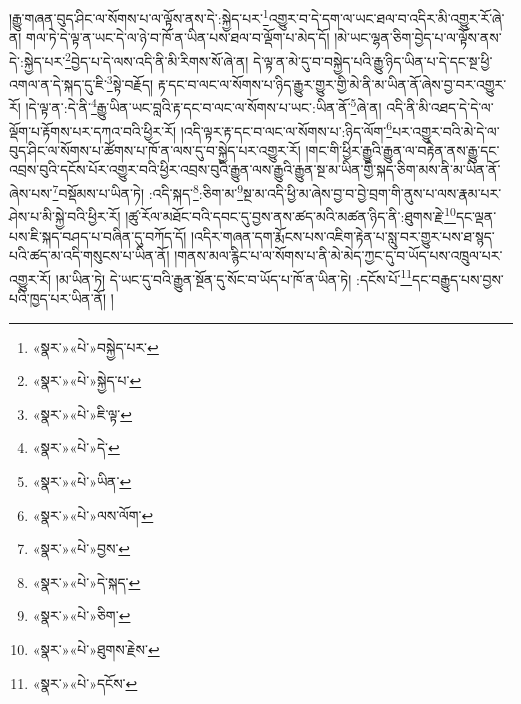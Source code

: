 །རྒྱུ་གཞན་བུད་ཤིང་ལ་སོགས་པ་ལ་ལྟོས་ནས་དེ་:སྐྱེད་པར་\footnote{«སྣར་»«པེ་»བསྐྱེད་པར་}འགྱུར་བ་དེ་དག་ལ་ཡང་ཐལ་བ་འདིར་མི་འགྱུར་རོ་ཞེ་ན། གལ་ཏེ་དེ་ལྟ་ན་ཡང་དེ་ལ་ཉེ་བ་ཁོ་ན་ཡིན་པས་ཐལ་བ་ལྡོག་པ་མེད་དོ། །མེ་ཡང་ལྷན་ཅིག་བྱེད་པ་ལ་ལྟོས་ནས་དེ་:སྐྱེད་པར་\footnote{«སྣར་»«པེ་»སྐྱེད་པ་}བྱེད་པ་དེ་ལས་འདི་ནི་མི་རིགས་སོ་ཞེ་ན། དེ་ལྟ་ན་མེ་དུ་བ་བསྐྱེད་པའི་རྒྱུ་ཉིད་ཡིན་པ་དེ་དང་སྔ་ཕྱི་འགལ་ན་དེ་སྐད་དུ་ཇི་\footnote{«སྣར་»«པེ་»ཇི་ལྟ་}སྟེ་བརྗོད། རྟ་དང་བ་ལང་ལ་སོགས་པ་ཉིད་རྒྱུར་གྱུར་གྱི་མེ་ནི་མ་ཡིན་ནོ་ཞེས་བྱ་བར་འགྱུར་རོ། །དེ་ལྟ་ན་:དེ་ནི་\footnote{«སྣར་»«པེ་»དེ་}རྒྱུ་ཡིན་ཡང་བླའི་རྟ་དང་བ་ལང་ལ་སོགས་པ་ཡང་:ཡིན་ནོ་\footnote{«སྣར་»«པེ་»ཡིན་}ཞེ་ན། འདི་ནི་མི་འཐད་དེ་དེ་ལ་ལྡོག་པ་རྟོགས་པར་དཀའ་བའི་ཕྱིར་རོ། །འདི་ལྟར་རྟ་དང་བ་ལང་ལ་སོགས་པ་:ཉིད་ལོག་\footnote{«སྣར་»«པེ་»ལས་ལོག་}པར་འགྱུར་བའི་མེ་དེ་ལ་བུད་ཤིང་ལ་སོགས་པ་ཚོགས་པ་ཁོ་ན་ལས་དུ་བ་སྐྱེད་པར་འགྱུར་རོ། །གང་གི་ཕྱིར་རྒྱུའི་རྒྱུན་ལ་བརྟེན་ནས་རྒྱུ་དང་འབྲས་བུའི་དངོས་པོར་འགྱུར་བའི་ཕྱིར་འབྲས་བུའི་རྒྱུན་ལས་རྒྱུའི་རྒྱུན་སྔ་མ་ཡིན་གྱི་སྐད་ཅིག་མས་ནི་མ་ཡིན་ནོ་ཞེས་པས་\footnote{«སྣར་»«པེ་»བྱས་}བསྡོམས་པ་ཡིན་ཏེ། :འདི་སྐད་\footnote{«སྣར་»«པེ་»དེ་སྐད་}:ཅིག་མ་\footnote{«སྣར་»«པེ་»ཅིག་}སྔ་མ་འདི་ཕྱི་མ་ཞེས་བྱ་བ་བྱེ་བྲག་གི་ནུས་པ་ལས་རྣམ་པར་ཤེས་པ་མི་སྐྱེ་བའི་ཕྱིར་རོ། །ཚུ་རོལ་མཐོང་བའི་དབང་དུ་བྱས་ནས་ཚད་མའི་མཚན་ཉིད་ནི་:ཐུགས་རྗེ་\footnote{«སྣར་»«པེ་»ཐུགས་རྗེས་}དང་ལྡན་པས་ཇི་སྐད་བཤད་པ་བཞིན་དུ་བཀོད་དོ། །འདིར་གཞན་དག་རྨོངས་པས་འཇིག་རྟེན་པ་སླུ་བར་གྱུར་པས་ཐ་སྙད་པའི་ཚད་མ་འདི་གསུངས་པ་ཡིན་ནོ། །གནས་མལ་རྙིང་པ་ལ་སོགས་པ་ནི་མེ་མེད་ཀྱང་དུ་བ་ཡོད་པས་འཁྲུལ་པར་འགྱུར་རོ། །མ་ཡིན་ཏེ། དེ་ཡང་དུ་བའི་རྒྱུན་སྔོན་དུ་སོང་བ་ཡོད་པ་ཁོ་ན་ཡིན་ཏེ། :དངོས་པོ་\footnote{«སྣར་»«པེ་»དངོས་}དང་བརྒྱུད་པས་བྱས་པའི་ཁྱད་པར་ཡིན་ནོ། །
